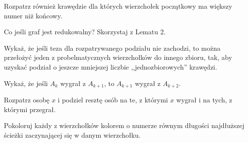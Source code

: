 
\begin{hints_list}
	\item Rozpatrz również krawędzie dla których wierzchołek początkowy ma większy numer niż końcowy.
	\item Co jeśli graf jest redukowalny? Skorzystaj z Lematu 2.
	\item Wykaż, że jeśli teza dla rozpatrywanego podziału nie zachodzi, to można przełożyć jeden z probelmatycznych wierzchołków do innego zbioru, tak, aby uzyskać podział o jeszcze mniejszej liczbie ,,jednozbiorowych'' krawędzi.
	\item Wykaż, że jeśli $A_k$ wygrał z $A_{k + 1}$, to $A_{k + 1}$ wygrał z $A_{k + 2}$.
	\item Rozpatrz osobę $x$ i podziel resztę osób na te, z którymi $x$ wygrał i na tych, z którymi przegrał. 
	\item Pokoloruj każdy z wierzchołków kolorem o numerze równym długości najdłuższej ścieżki zaczynającej się w danym wierzchołku.
\end{hints_list}